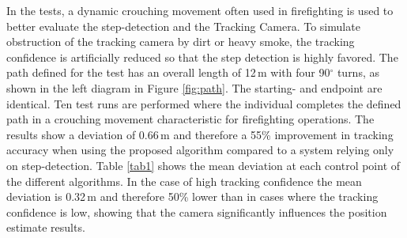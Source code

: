 \documentclass[engproc,conferenceproceedings,submit,pdftex,moreauthors]{Definitions/mdpi}
\begin{document}
In the tests, a dynamic crouching movement often used in firefighting is used to better evaluate the step-detection and the Tracking Camera. To simulate obstruction of the tracking camera by dirt or heavy smoke, the tracking confidence is artificially reduced so that the step detection is highly favored. The path defined for the test has an overall length of 12\,m with four 90$^\circ$ turns, as shown in the left diagram in Figure \ref{fig:path}. The starting- and endpoint are identical. Ten test runs are performed where the individual completes the defined path in a crouching movement characteristic for firefighting operations. The results show a deviation of 0.66\,m and therefore a 55\% improvement in tracking accuracy when using the proposed algorithm compared to a system relying only on step-detection. Table \ref{tab1} shows the mean deviation at each control point of the different algorithms. In the case of high tracking confidence the mean deviation is 0.32\,m and therefore 50\% lower than in cases where the tracking confidence is low, showing that the camera significantly influences the position estimate results. 
\end{document}
